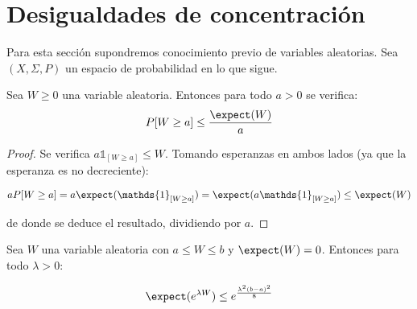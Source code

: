 \section{Desigualdades de concentración}
Para esta sección supondremos conocimiento previo de variables aleatorias. Sea $(X,\Sigma,P)$ un espacio 
de probabilidad en lo que sigue.

\begin{lemma}
Sea $W \ge 0$ una variable aleatoria. Entonces para todo $a > 0$ se verifica:
\[P[W \ge a] \le \frac{\expect(W)}{a}\]

\label{ineq:markov}
\end{lemma}

\begin{proof}
 Se verifica $a\mathds{1}_{[W\ge a]} \le W$. Tomando esperanzas en ambos lados (ya que la esperanza es no 
 decreciente):
 
 \[aP[W\ge a] = a\expect(\mathds{1}_{[W\ge a]}) = \expect(a\mathds{1}_{[W\ge a]}) \le \expect(W)\]
 
 de donde se deduce el resultado, dividiendo por $a$.
\end{proof}

\begin{lemma}
 Sea $W$ una variable aleatoria con $a\le W \le b$ y $\expect(W) = 0$. Entonces para todo $\lambda > 0$:
 
 \[\expect(e^{\lambda W}) \le e^{\frac{\lambda^2(b-a)^2}{8}}\]
 
 \label{lemma:hoeffding}
\end{lemma}

